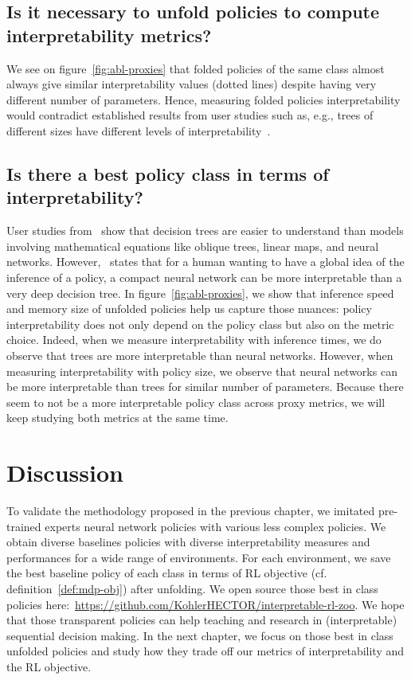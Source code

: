 \subsection{Is it necessary to unfold policies to compute interpretability metrics?}
We see on figure~\ref{fig:abl-proxies} that folded policies of the same class almost always give similar interpretability values (dotted lines) despite having very different number of parameters.
Hence, measuring folded policies interpretability would contradict established results from user studies such as, e.g., trees of different sizes have different levels of interpretability~\cite{study-4}. 

\subsection{Is there a best policy class in terms of interpretability?}
User studies from~\cite{study-1,study-2,study-3} show that decision trees are easier to understand than models involving mathematical equations like oblique trees, linear maps, and neural networks.
However,~\cite{lipton} states that for a human wanting to have a global idea of the inference of a policy, a compact neural network can be more interpretable than a very deep decision tree.
In figure~\ref{fig:abl-proxies}, we show that inference speed and memory size of unfolded policies help us capture those nuances: policy interpretability does not only depend on the policy class but also on the metric choice.
Indeed, when we measure interpretability with inference times, we do observe that trees are more interpretable than neural networks.
However, when measuring interpretability with policy size, we observe that neural networks can be more interpretable than trees for similar number of parameters.
Because there seem to not be a more interpretable policy class across proxy metrics, we will keep studying both metrics at the same time.

\section{Discussion}
To validate the methodology proposed in the previous chapter, we imitated pre-trained experts neural network policies with various less complex policies.
We obtain diverse baselines policies with diverse interpretability measures and performances for a wide range of environments.
For each environment, we save the best baseline policy of each class in terms of RL objective (cf. definition~\ref{def:mdp-obj}) after unfolding.
We open source those best in class policies here:~\url{https://github.com/KohlerHECTOR/interpretable-rl-zoo}.
We hope that those transparent policies can help teaching and research in (interpretable) sequential decision making.
In the next chapter, we focus on those best in class unfolded policies and study how they trade off our metrics of interpretability and the RL objective.
